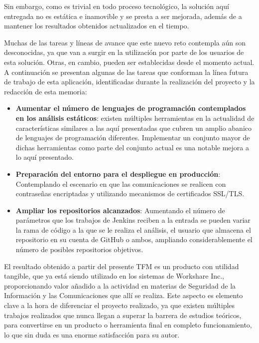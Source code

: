 Sin embargo, como es trivial en todo proceso tecnológico, la solución aquí entregada no es estática e inamovible y se presta a ser mejorada, además de a mantener los resultados obtenidos actualizados en el tiempo.

Muchas de las tareas y líneas de avance que este nuevo reto contempla aún son desconocidas, ya que van a surgir en la utilización por parte de los usuarios de esta solución. Otras, en cambio, pueden ser establecidas desde el momento actual. A continuación se presentan algunas de las tareas que conforman la línea futura de trabajo de esta aplicación, identificadas durante la realización del proyecto y la redacción de esta memoria:

\begin{itemize}
	\item \textbf{Aumentar el número de lenguajes de programación contemplados en los análisis estáticos}: existen múltiples herramientas en la actualidad de características similares a las aquí presentadas que cubren un amplio abanico de lenguajes de programación diferentes. Implementar un conjunto mayor de dichas herramientas como parte del conjunto actual es una notable mejora a lo aquí presentado.
	\item \textbf{Preparación del entorno para el despliegue en producción}: Contemplando el escenario en que las comunicaciones se realicen con contraseñas encriptadas y utilizando mecanismos de certificados SSL/TLS.
	\item \textbf{Ampliar los repositorios alcanzados}: Aumentando el número de parámetros que los trabajos de Jenkins reciben a la entrada se pueden variar la rama de código a la que se le realiza el análisis, el usuario que almacena el repositorio en su cuenta de GitHub o ambos, ampliando considerablemente el número de posibles repositorios objetivos.  
\end{itemize}

El resultado obtenido a partir del presente \gls{TFM} es un producto con utilidad tangible, que ya está siendo utilizado en los sistemas de Workshare Inc., proporcionando valor añadido a la actividad en materias de Seguridad de la Información y las Comunicaciones que allí se realiza. Este aspecto es elemento clave a la hora de diferenciar el proyecto realizado, ya que existen múltiples trabajos realizados que nunca llegan a superar la barrera de estudios teóricos, para convertirse en un producto o herramienta final en completo funcionamiento, lo que sin duda es una enorme satisfacción para su autor.

\endinput
